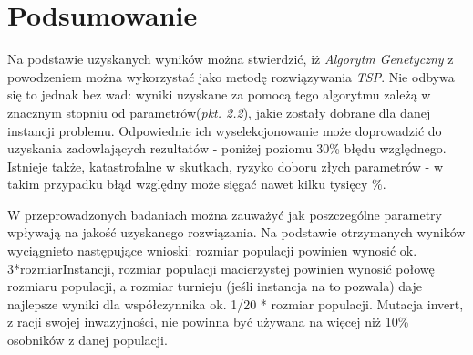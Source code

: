 \documentclass{article}
\begin{document}
\newpage	
\section{Podsumowanie}
\par Na podstawie uzyskanych wyników można stwierdzić, iż \textit{Algorytm Genetyczny} z powodzeniem można wykorzystać jako metodę rozwiązywania \textit{TSP}. Nie odbywa się to jednak bez wad: wyniki uzyskane za pomocą tego algorytmu zależą w znacznym stopniu od parametrów(\textit{pkt. 2.2}), jakie zostały dobrane dla danej instancji problemu. Odpowiednie ich wyselekcjonowanie może doprowadzić do uzyskania zadowlających rezultatów - poniżej poziomu 30\% błędu względnego. Istnieje także, katastrofalne w skutkach, ryzyko doboru złych parametrów - w takim przypadku błąd względny może sięgać nawet kilku tysięcy \%.
\\ \par W przeprowadzonych badaniach można zauważyć jak poszczególne parametry wpływają na jakość uzyskanego rozwiązania. Na podstawie otrzymanych wyników wyciągnieto następujące wnioski: rozmiar populacji powinien wynosić ok. 3*rozmiarInstancji, rozmiar populacji macierzystej powinien wynosić połowę rozmiaru populacji, a rozmiar turnieju (jeśli instancja na to pozwala) 
daje najlepsze wyniki dla współczynnika ok. 1/20 *  rozmiar populacji. Mutacja invert, z racji swojej inwazyjności, nie powinna być używana na więcej niż 10\% osobników z danej populacji.

\par


%
%	
%

\end{document}
